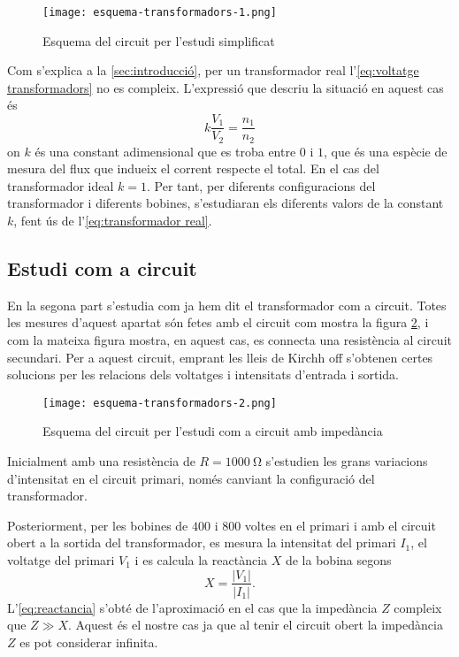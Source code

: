 \begin{figure}[htb]
  \centering \small \sffamily
  \texttt{[image: esquema-transformadors-1.png]}
  \caption{Esquema del circuit per l'estudi simplificat}
  \label{fig:esquema 1}
\end{figure}

Com s'explica a la \cref{sec:introducció}, per un transformador real l'\cref{eq:voltatge transformadors} no es compleix. L'expressió que descriu la situació en aquest cas és 
\begin{equation}\label{eq:transformador real}
  k\frac{V_1}{V_2}=\frac{n_1}{n_2}
\end{equation}
on $k$ és una constant adimensional que es troba entre $0$ i $1$, que és una espècie de mesura del flux que indueix el corrent respecte el total. En el cas del transformador ideal $k=1$. Per tant, per diferents configuracions del transformador i diferents bobines, s'estudiaran els diferents valors de la constant $k$, fent ús de l'\cref{eq:transformador real}.

\subsection{Estudi com a circuit}\label{sec:metcirc}
En la segona part s'estudia com ja hem dit el transformador com a circuit. Totes les mesures d'aquest apartat són fetes amb el circuit com mostra la figura \cref{fig:esq2}, i com la mateixa figura mostra, en aquest cas, es connecta una resistència al circuit secundari. Per a aquest circuit, emprant les lleis de Kirchh
off s'obtenen certes solucions per les relacions dels voltatges i intensitats d'entrada i sortida. 

\begin{figure}[htbp!]
  \centering \small \sffamily
  \texttt{[image: esquema-transformadors-2.png]}
  \caption{Esquema del circuit per l'estudi com a circuit amb impedància}
  \label{fig:esq2}
\end{figure}

Inicialment amb una resistència de $R= \SI{1000}{\ohm}$ s'estudien les grans variacions d'intensitat en el circuit primari, només canviant la configuració del transformador. 

Posteriorment, per les bobines de $400$ i $800$ voltes en el primari i amb el circuit obert a la sortida del transformador, es mesura  la intensitat del primari $I_1$, el voltatge del primari $V_1$ i es calcula la reactància $X$ de la bobina segons
\begin{equation}\label{eq:reactancia}
  X=\frac{|V_1|}{|I_1|}.
\end{equation}
L'\cref{eq:reactancia} s'obté de l'aproximació en el cas que la impedància $Z$ compleix que $Z \gg X$. Aquest és el nostre cas ja que al tenir el circuit obert la impedància $Z$ es pot considerar infinita. 

